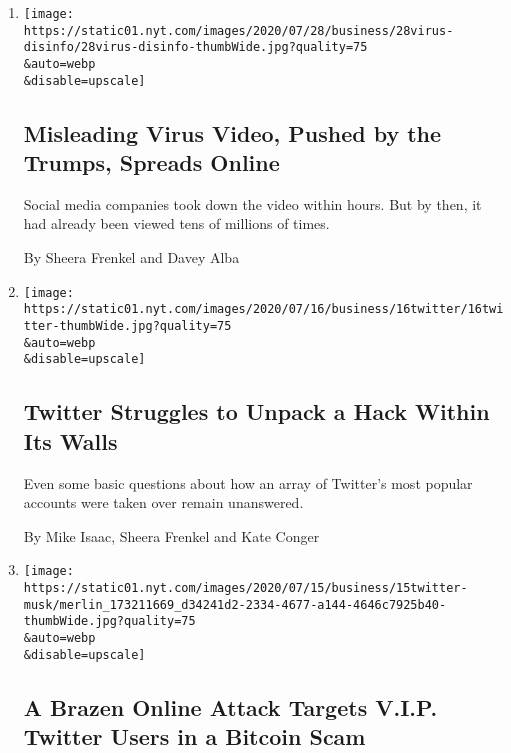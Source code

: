 \begin{enumerate}
\def\labelenumi{\arabic{enumi}.}
\item
  \href{/2020/07/28/technology/virus-video-trump.html}{}

  \texttt{[image: https://static01.nyt.com/images/2020/07/28/business/28virus-disinfo/28virus-disinfo-thumbWide.jpg?quality=75\\\&auto=webp\\\&disable=upscale]}

  \hypertarget{misleading-virus-video-pushed-by-the-trumps-spreads-online}{%
  \subsection{Misleading Virus Video, Pushed by the Trumps, Spreads
  Online}\label{misleading-virus-video-pushed-by-the-trumps-spreads-online}}

  Social media companies took down the video within hours. But by then,
  it had already been viewed tens of millions of times.

  By Sheera Frenkel and Davey Alba
\item
  \href{/2020/07/16/technology/twitter-hack-investigation.html}{}

  \texttt{[image: https://static01.nyt.com/images/2020/07/16/business/16twitter/16twitter-thumbWide.jpg?quality=75\\\&auto=webp\\\&disable=upscale]}

  \hypertarget{twitter-struggles-to-unpack-a-hack-within-its-walls}{%
  \subsection{Twitter Struggles to Unpack a Hack Within Its
  Walls}\label{twitter-struggles-to-unpack-a-hack-within-its-walls}}

  Even some basic questions about how an array of Twitter's most popular
  accounts were taken over remain unanswered.

  By Mike Isaac, Sheera Frenkel and Kate Conger
\item
  \href{/2020/07/15/technology/twitter-hack-bill-gates-elon-musk.html}{}

  \texttt{[image: https://static01.nyt.com/images/2020/07/15/business/15twitter-musk/merlin\_173211669\_d34241d2-2334-4677-a144-4646c7925b40-thumbWide.jpg?quality=75\\\&auto=webp\\\&disable=upscale]}

  \hypertarget{a-brazen-online-attack-targets-vip-twitter-users-in-a-bitcoin-scam}{%
  \subsection{A Brazen Online Attack Targets V.I.P. Twitter Users in a
  Bitcoin
  Scam}\label{a-brazen-online-attack-targets-vip-twitter-users-in-a-bitcoin-scam}}


\end{enumerate}
